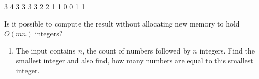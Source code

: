 \documentclass[letterpaper,10pt,english,openany,oneside]{sphinxmanual}
\begin{document}
\begin{sphinxVerbatim}[commandchars=\\\{\}]
3 4
3 3 3 3
2 2 1 1
0 0 \PYGZhy{}1 \PYGZhy{}1
\end{sphinxVerbatim}

\sphinxAtStartPar
Is it possible to compute the result without allocating new memory to hold \(O(mn)\) integers?
\begin{enumerate}
%
\setcounter{enumi}{2}
\item {} 
\sphinxAtStartPar
The input contains \(n\), the count of numbers followed by \(n\) integers.
Find the smallest integer and also find, how many numbers are equal to this smallest integer.

\end{enumerate}



\renewcommand{\indexname}{Index}
\printindex
\end{document}
